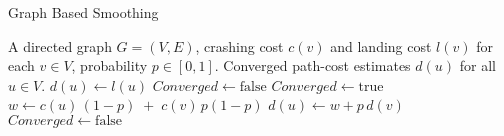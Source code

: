 \begin{algorithm}[htbp]
  \caption{Graph Based Smoothing}
  \label{alg:flow}
  \begin{algorithmic}[1]
    \Require A directed graph \(G=(V,E)\), crashing cost \(c(v)\) and landing cost \(l(v)\) for each \(v\in V\), probability \(p\in[0,1]\).
    \Ensure Converged path-cost estimates \(d(u)\) for all \(u\in V\).
      \State \(d(u)\gets l(u)\) 
    \EndFor
    \State \(\mathit{Converged}\gets \text{false}\)
      \State \(\mathit{Converged}\gets \text{true}\)
        \State \(w \gets c(u)\,(1-p)\;+\;c(v)\,p(1-p)\) 
          \State \(d(u)\gets w + p\,d(v)\)
          \State \(\mathit{Converged}\gets \text{false}\)
        \EndIf
      \EndFor
    \EndWhile
  \end{algorithmic}
\end{algorithm}